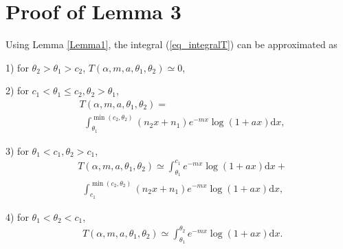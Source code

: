 \section{Proof of Lemma 3}
\label{proof_Lemma3}
Using Lemma \ref{Lemma1}, the  integral (\ref{eq_integralT})  can be approximated as

1) for $\theta_2>\theta_1>c_2$, $T(\alpha,m,a,\theta_1,\theta_2) \simeq 0$,

2) for $c_1<\theta_1\leq c_2, \theta_2>\theta_1$,
\begin{align}
  &  T(\alpha,m,a,\theta_1,\theta_2) = \nonumber\\& ~~\int_{\theta_1}^{\min(c_2,\theta_2)} (n_2x+n_1)e^{-mx}\log(1+ax) \text{d}x,
\end{align}

3) for $\theta_1<c_1,\theta_2>c_1$,
\begin{align}
   & T(\alpha,m,a,\theta_1,\theta_2) \simeq \int_{\theta_1}^{c_1} e^{-mx}\log(1+ax)\text{d}x + \nonumber\\
   &~~ \int_{c_1}^{\min(c_2,\theta_2)} (n_2x+n_1)e^{-mx}\log(1+ax) \text{d}x,
\end{align}

4) for $\theta_1<\theta_2<c_1$,
\begin{align}
   & T(\alpha,m,a,\theta_1,\theta_2) \simeq \int_{\theta_1}^{\theta_2} e^{-mx}\log(1+ax)\text{d}x.
\end{align}

